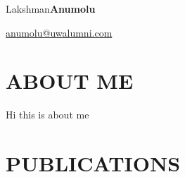 \documentclass{res}
\begin{document}
	\hspace*{-0.05\textwidth}
	\begin{minipage}[t]{0.7\textwidth}
	\begin{flushleft}
	\vspace*{\fill}
	{\fontsize{35 }{35 }\selectfont Lakshman\textbf{Anumolu}}
	\end{flushleft}
	\end{minipage}
	\begin{minipage}[t]{0.34\textwidth}
	\begin{flushright}
	\href{mailto:anumolu@uwalumni.com}{anumolu@uwalumni.com} \\ 
	\end{flushright}
	\end{minipage}

	\begin{resume}
	
	
	\section{\MakeUppercase{About me}} \vskip 0.15in
	Hi this is about me
	
	
	
	
	
	
	
	\section{\MakeUppercase{Publications}} \vskip 0.35in
	\begin{itemize}[leftmargin=\parindent]
	\setlength{\itemsep}{4pt}
	

\end{itemize}
\end{resume}
\end{document}
